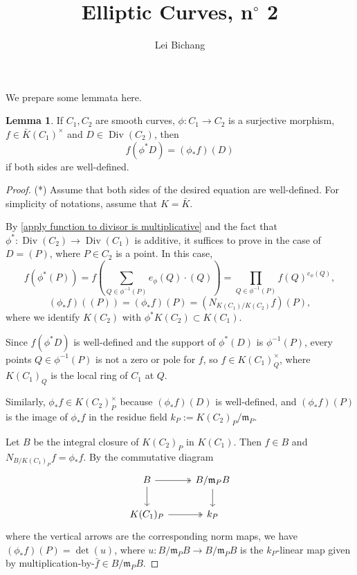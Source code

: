 \documentclass{article}
\title{Elliptic Curves, n$^\circ$ 2}
\author{Lei Bichang}
\theoremstyle{definition}
\newtheorem{lemma}{Lemma}
\theoremstyle{remark}
\DeclareMathOperator{\Div}{Div}
\newcommand{\m}{\mathfrak{m}}
\begin{document}
\maketitle

We prepare some lemmata here.
\begin{lemma}\label{compute norm}
    If $C_1, C_2$ are smooth curves, $\phi : C_1\to C_2$ is a surjective morphism, $f\in \bar{K}(C_1)^\times$ and $D\in\Div(C_2)$, then \[f(\phi^*D) = (\phi_*f)(D)\] if both sides are well-defined.
\end{lemma}
\begin{proof}(*)
    Assume that both sides of the desired equation are well-defined.
    For simplicity of notations, assume that $K = \bar{K}$.

    By \cref{apply function to divisor is multiplicative} and the fact that $\phi^* : \Div(C_2)\to\Div(C_1)$ is additive, it suffices to prove in the case of $D = (P)$, where $P\in C_2$ is a point.
    In this case, \[f(\phi^*(P)) = f\left(\sum_{Q\in\phi^{-1}(P)}e_\phi(Q)\cdot(Q)\right) = \prod_{Q\in\phi^{-1}(P)} f(Q)^{e_\phi(Q)},\]
    \[(\phi_*f)((P)) = (\phi_*f)(P) = (N_{K(C_1)/K(C_2)} f)(P),\]
    where we identify $K(C_2)$ with $\phi^*K(C_2)\subset K(C_1)$.

    Since $f(\phi^*D)$ is well-defined and the support of $\phi^*(D)$ is $\phi^{-1}(P)$, every points $Q\in\phi^{-1}(P)$ is not a zero or pole for $f$, so $f\in K(C_1)_{Q}^\times$, where $K(C_1)_{Q}$ is the local ring of $C_1$ at $Q$.

    Similarly, $\phi_*f\in K(C_2)_P^\times$ because $(\phi_*f)(D)$ is well-defined, and $(\phi_*f)(P)$ is the image of $\phi_*f$ in the residue field $k_P := K(C_2)_P/\mathfrak{m}_P$.

    Let $B$ be the integral closure of $K(C_2)_P$ in $K(C_1)$.
    Then $f\in B$ and $N_{B/K(C_1)_P}f = \phi_*f$.
    By the commutative diagram
\[\begin{tikzcd}
	B & {B/\mathfrak m_PB} \\
	{K(C_1)_P} & {k_P}
	\arrow[two heads, from=1-1, to=1-2]
	\arrow[from=1-1, to=2-1]
	\arrow[from=1-2, to=2-2]
	\arrow[two heads, from=2-1, to=2-2]
\end{tikzcd}\]where the vertical arrows are the corresponding norm maps,
    we have $(\phi_*f)(P) = \det(u)$, where $u : B/\m_PB\to B/\m_PB$ is the $k_P$-linear map given by multiplication-by-$\bar{f}\in B/\m_PB$.


\end{proof}
\end{document}
